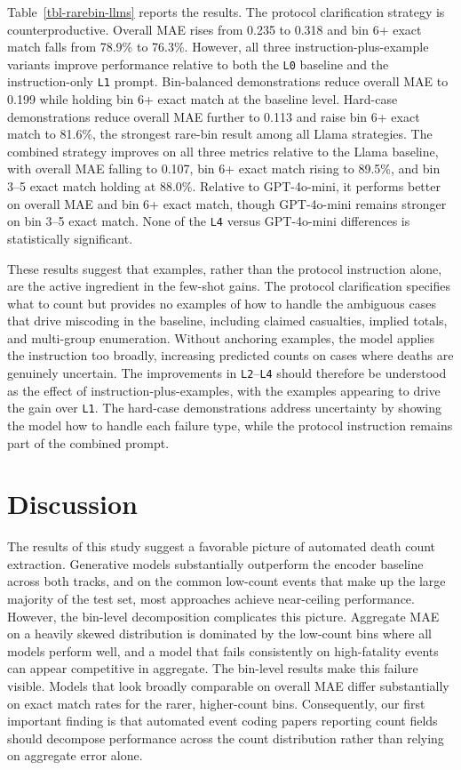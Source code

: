 \documentclass[
  11pt,
]{article}
\begin{document}
Table~\ref{tbl-rarebin-llms} reports the results. The protocol
clarification strategy is counterproductive. Overall MAE rises from
0.235 to 0.318 and bin 6+ exact match falls from 78.9\% to 76.3\%.
However, all three instruction-plus-example variants improve performance
relative to both the \texttt{L0} baseline and the instruction-only
\texttt{L1} prompt. Bin-balanced demonstrations reduce overall MAE to
0.199 while holding bin 6+ exact match at the baseline level. Hard-case
demonstrations reduce overall MAE further to 0.113 and raise bin 6+
exact match to 81.6\%, the strongest rare-bin result among all Llama
strategies. The combined strategy improves on all three metrics relative
to the Llama baseline, with overall MAE falling to 0.107, bin 6+ exact
match rising to 89.5\%, and bin 3--5 exact match holding at 88.0\%.
Relative to GPT-4o-mini, it performs better on overall MAE and bin 6+
exact match, though GPT-4o-mini remains stronger on bin 3--5 exact
match. None of the \texttt{L4} versus GPT-4o-mini differences is
statistically significant.

These results suggest that examples, rather than the protocol
instruction alone, are the active ingredient in the few-shot gains. The
protocol clarification specifies what to count but provides no examples
of how to handle the ambiguous cases that drive miscoding in the
baseline, including claimed casualties, implied totals, and multi-group
enumeration. Without anchoring examples, the model applies the
instruction too broadly, increasing predicted counts on cases where
deaths are genuinely uncertain. The improvements in
\texttt{L2}--\texttt{L4} should therefore be understood as the effect of
instruction-plus-examples, with the examples appearing to drive the gain
over \texttt{L1}. The hard-case demonstrations address uncertainty by
showing the model how to handle each failure type, while the protocol
instruction remains part of the combined prompt.

\section{Discussion}\label{discussion}

The results of this study suggest a favorable picture of automated death
count extraction. Generative models substantially outperform the encoder
baseline across both tracks, and on the common low-count events that
make up the large majority of the test set, most approaches achieve
near-ceiling performance. However, the bin-level decomposition
complicates this picture. Aggregate MAE on a heavily skewed distribution
is dominated by the low-count bins where all models perform well, and a
model that fails consistently on high-fatality events can appear
competitive in aggregate. The bin-level results make this failure
visible. Models that look broadly comparable on overall MAE differ
substantially on exact match rates for the rarer, higher-count bins.
Consequently, our first important finding is that automated event coding
papers reporting count fields should decompose performance across the
count distribution rather than relying on aggregate error alone.
\end{document}
